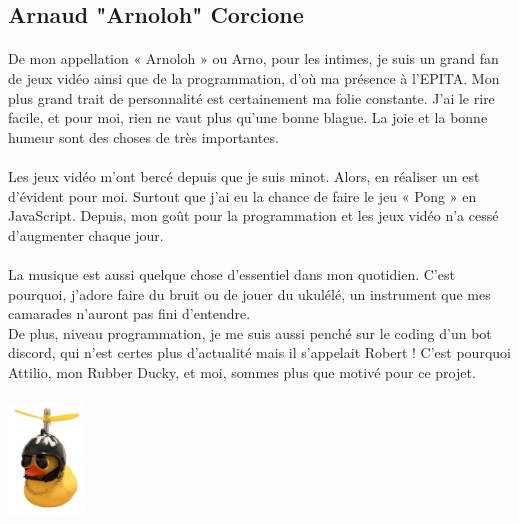 \documentclass[12pt,a4paper]{article}
\begin{document}
\subsection{Arnaud "Arnoloh" Corcione}
\paragraph{}
De mon appellation « Arnoloh » ou Arno, pour les intimes, je suis un grand fan de jeux vidéo ainsi que de la programmation, d’où ma présence à l’EPITA. Mon plus grand trait de personnalité est certainement ma folie constante. J’ai le rire facile, et pour moi, rien ne vaut plus qu'une bonne blague. La joie et la bonne humeur sont des choses de très importantes.
\\
\\
Les jeux vidéo m’ont bercé depuis que je suis minot. Alors, en réaliser un est d’évident pour moi. Surtout que j’ai eu la chance de faire le jeu « Pong » en JavaScript. Depuis, mon goût pour la programmation et les jeux vidéo n'a cessé d’augmenter chaque jour.
\\
\\
La musique est aussi quelque chose d'essentiel dans mon quotidien. C'est pourquoi, j'adore faire du bruit ou de jouer du ukulélé, un instrument que mes camarades n'auront pas fini d'entendre.
\\
De plus, niveau programmation, je me suis aussi penché sur le coding d’un bot discord, qui n’est certes plus d’actualité mais il s’appelait Robert !
C’est pourquoi Attilio, mon Rubber Ducky, et moi, sommes plus que motivé pour ce projet.
\\
 \vspace*{.2cm}
    \\
   \hspace*{6.5cm} \includegraphics[width = 2cm]{Image/attilio.png}
    \begin{adjustwidth}{20pt}{20pt}
    \end{adjustwidth}
    \\
\newpage
\vspace*{.1cm}
\end{document}
